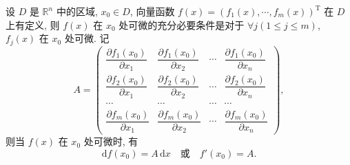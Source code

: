 \documentclass[UTF8,12pt,a4paper,fontset=fandol]{ctexart}
\begin{document}
\begin{theorem}\label{course-theorem-14-1-4}\quad 设 $D$ 是 $\mathbb R^n$ 中的区域, $x_0\in D$, 向量函数 $f(x)=(f_1(x),\cdots,f_m(x))^\mathrm T$ 在 $D$ 上有定义, 则 $f(x)$ 在 $x_0$ 处可微的充分必要条件是对于 $\forall j(1\leqslant j\leqslant m)$, $f_j(x)$ 在 $x_0$ 处可微. 记
\[
  A=
  \begin{pmatrix}
    \dfrac{\partial f_1(x_0)}{\partial x_1}&\dfrac{\partial f_1(x_0)}{\partial x_2}&\cdots&\dfrac{\partial f_1(x_0)}{\partial x_n}\\
    \dfrac{\partial f_2(x_0)}{\partial x_1}&\dfrac{\partial f_2(x_0)}{\partial x_2}&\cdots&\dfrac{\partial f_2(x_0)}{\partial x_n}\\
    \cdots&\cdots&\cdots&\cdots\\
    \dfrac{\partial f_m(x_0)}{\partial x_1}&\dfrac{\partial f_m(x_0)}{\partial x_2}&\cdots&\dfrac{\partial f_m(x_0)}{\partial x_n}
  \end{pmatrix},
\]
则当 $f(x)$ 在 $x_0$ 处可微时, 有
\[
  \mathrm df(x_0)=A\,\mathrm dx\quad\text{或}\quad f'(x_0)=A.
\]

\end{theorem}
\end{document}
